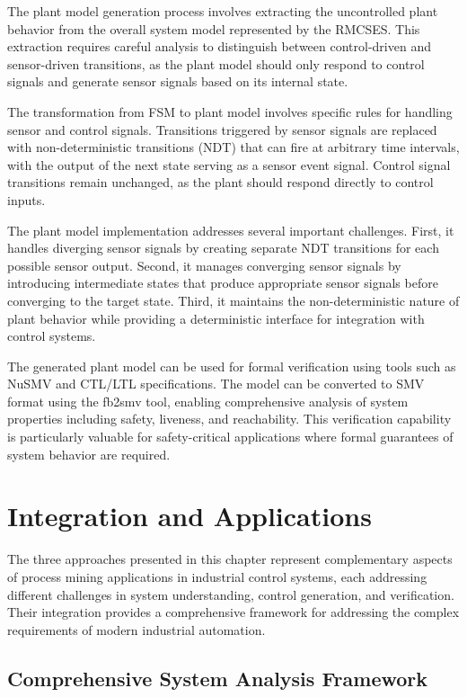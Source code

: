 The plant model generation process involves extracting the uncontrolled plant behavior from the overall system model represented by the RMCSES. This extraction requires careful analysis to distinguish between control-driven and sensor-driven transitions, as the plant model should only respond to control signals and generate sensor signals based on its internal state.



The transformation from FSM to plant model involves specific rules for handling sensor and control signals. Transitions triggered by sensor signals are replaced with non-deterministic transitions (NDT) that can fire at arbitrary time intervals, with the output of the next state serving as a sensor event signal. Control signal transitions remain unchanged, as the plant should respond directly to control inputs.

The plant model implementation addresses several important challenges. First, it handles diverging sensor signals by creating separate NDT transitions for each possible sensor output. Second, it manages converging sensor signals by introducing intermediate states that produce appropriate sensor signals before converging to the target state. Third, it maintains the non-deterministic nature of plant behavior while providing a deterministic interface for integration with control systems.

The generated plant model can be used for formal verification using tools such as NuSMV and CTL/LTL specifications. The model can be converted to SMV format using the fb2smv tool, enabling comprehensive analysis of system properties including safety, liveness, and reachability. This verification capability is particularly valuable for safety-critical applications where formal guarantees of system behavior are required.

\section{Integration and Applications}

The three approaches presented in this chapter represent complementary aspects of process mining applications in industrial control systems, each addressing different challenges in system understanding, control generation, and verification. Their integration provides a comprehensive framework for addressing the complex requirements of modern industrial automation.

\subsection{Comprehensive System Analysis Framework}

